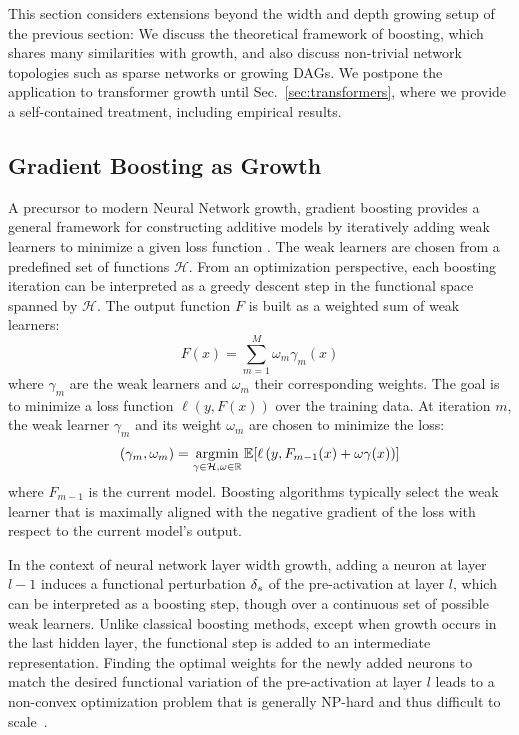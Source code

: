 This section considers extensions beyond the width and depth growing setup of the previous section: We discuss the theoretical framework of boosting, which shares many similarities with growth, and also discuss non-trivial network topologies such as sparse networks or growing DAGs. We postpone the application to transformer growth until Sec.~\ref{sec:transformers}, where we provide a self-contained treatment, including empirical results.


\subsection{Gradient Boosting as Growth}\label{sec:boosting}

A precursor to modern Neural Network growth, gradient boosting provides a general framework for constructing additive models by iteratively adding weak learners to minimize a given loss function \citep{friedman_greedy_2001}. The weak learners are chosen from a predefined set of functions $\mathcal{H}$. From an optimization perspective, each boosting iteration can be interpreted as a greedy descent step in the functional space spanned by $\mathcal{H}$. The output function $F$ is built as a weighted sum of weak learners:
$$F(x) = \sum_{m=1}^M \omega_m \gamma_m(x)$$
where $\gamma_m$ are the weak learners and $\omega_m$ their corresponding weights. The goal is to minimize a loss function $\ell{}(y, F(x))$ over the training data. At iteration $m$, the weak learner $\gamma_m$ and its weight $\omega_m$ are chosen to minimize the loss:
$$(\gamma_m, \omega_m) = \operatorname*{\arg\!\min}_{\gamma \in \mathcal{H}, \omega\in\mathbb{R}}  \mathbb{E}[\ell\left(y, F_{m-1}(x) + \omega \gamma(x)\right)]$$
where $F_{m-1}$ is the current model.
Boosting algorithms typically select the weak learner that is maximally aligned with the negative gradient of the loss with respect to the current model's output.

In the context of neural network layer width growth, adding a neuron at layer $l-1$ induces a functional perturbation $\delta_{s}$ of the pre-activation at layer $l$, which can be interpreted as a boosting step, though over a continuous set of possible weak learners.
Unlike classical boosting methods, except when growth occurs in the last hidden layer, the functional step is added to an intermediate representation.
Finding the optimal weights for the newly added neurons to match the desired functional variation of the pre-activation at layer $l$ leads to a non-convex optimization problem that is generally NP-hard  \citep{manurangsi2018computationalcomplexitytrainingrelus,bach_breaking_2017} and thus difficult to scale~\citep{liu_splitting_2019}.


